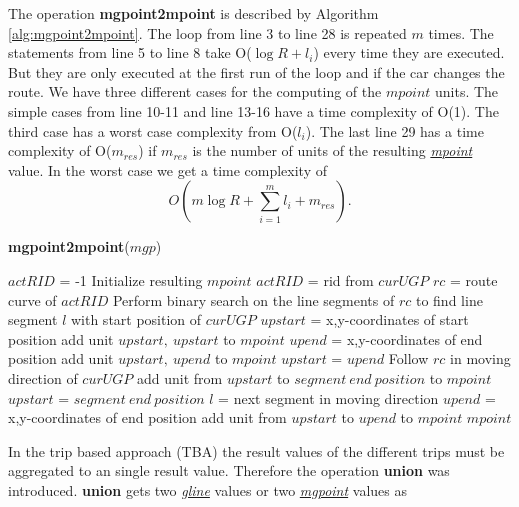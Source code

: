 \documentclass[a4paper]{article}
\newcommand{\op}[1]{\textbf{#1}}
\newcommand{\dt}[1]{\textsl{\underline{#1}}}
\begin{document}
The operation \op{mgpoint2mpoint} is described by Algorithm
\ref{alg:mgpoint2mpoint}. The loop from line 3 to line 28 is repeated $m$ times. The statements from
line 5 to line 8 take O($\log R + l_i$) every time they are executed. But they
are only executed at the first run of the loop and if the car changes the route.
We have three different cases for the computing of the $mpoint$ units. The
simple cases from line 10-11 and line 13-16 have a time complexity of O(1).
The third case has a worst case complexity from O($l_i$). The last line 29 has a time
complexity of O($m_{res}$) if $m_{res}$ is the number of units of the resulting
\dt{mpoint} value. In the worst case we get a time complexity of
\[O(m \log {R} + \sum_{i=1}^{m}{l_i} + m_{res}).\]
\begin{algorithm}[H]
  \caption{\op{mgpoint2mpoint}($mgp$)}
  \label{alg:mgpoint2mpoint}
  \begin{algorithmic}[1]
    \STATE $actRID$ = -1
    \STATE Initialize resulting $mpoint$
        \STATE $actRID$ = rid from $curUGP$
        \STATE $rc$ = route curve of $actRID$
        \STATE Perform binary search on the line segments of $rc$ to find
        line segment $l$ with start position of $curUGP$
        \STATE $upstart$ = x,y-coordinates of start position
      \ENDIF
        \STATE add unit $upstart,\ upstart$ to $mpoint$
      \ELSE
          \STATE $upend$ = x,y-coordinates of end position
          \STATE add unit $upstart,\ upend$ to $mpoint$
          \STATE $upstart$ = $upend$
        \ELSE
          \STATE Follow $rc$ in moving direction of $curUGP$
            \STATE add unit from $upstart$ to $segment\ end\ position$ to
$mpoint$
            \STATE $upstart$ = $segment\ end\ position$
            \STATE $l$ = next segment in moving direction
          \ENDWHILE
          \STATE $upend$ = x,y-coordinates of end position
          \STATE add unit from $upstart$ to $upend$ to $mpoint$
        \ENDIF
      \ENDIF
    \ENDFOR
    \RETURN $mpoint$
  \end{algorithmic}
\end{algorithm}
In the trip based approach (TBA) the result values of the different trips must
be
aggregated to an single result value. Therefore the operation \op{union} was
introduced. \op{union} gets two \dt{gline} values or two \dt{mgpoint} values as
\end{document}
